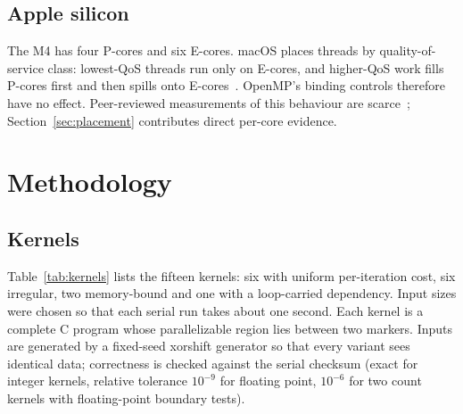\documentclass[conference]{IEEEtran}
\begin{document}
\subsection{Apple silicon}
The M4 has four P-cores and six E-cores. macOS places threads by quality-of-service class: lowest-QoS threads run only on E-cores, and higher-QoS work fills P-cores first and then spills onto E-cores~\cite{eclectic2022m1sched,eclectic2021m1perf}. OpenMP's binding controls therefore have no effect. Peer-reviewed measurements of this behaviour are scarce~\cite{lviv2025applesched}; Section~\ref{sec:placement} contributes direct per-core evidence.

\section{Methodology}\label{sec:method}
\subsection{Kernels}

Table~\ref{tab:kernels} lists the fifteen kernels: six with uniform per-iteration cost, six irregular, two memory-bound and one with a loop-carried dependency. Input sizes were chosen so that each serial run takes about one second.
Each kernel is a complete C program whose parallelizable region lies between two markers. Inputs are generated by a fixed-seed xorshift generator so that every variant sees identical data; correctness is checked against the serial checksum (exact for integer kernels, relative tolerance $10^{-9}$ for floating point, $10^{-6}$ for two count kernels with floating-point boundary tests).
\end{document}

